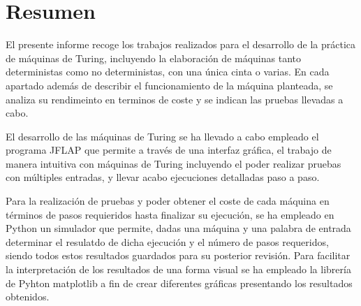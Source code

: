 \part{Resumen}

El presente informe recoge los trabajos realizados para el desarrollo de la práctica de máquinas de Turing, incluyendo la elaboración de máquinas tanto deterministas como no deterministas, con una única cinta o varias. En cada apartado además de describir el funcionamiento de la máquina planteada, se analiza su rendimeinto en terminos de coste y se indican las pruebas llevadas a cabo.\medskip

El desarrollo de las máquinas de Turing se ha llevado a cabo empleado el programa JFLAP \supercite{jflap} que permite a través de una interfaz gráfica, el trabajo de manera intuitiva con máquinas de Turing incluyendo el poder realizar pruebas con múltiples entradas, y llevar acabo ejecuciones detalladas paso a paso.\medskip

Para la realización de pruebas y poder obtener el coste de cada máquina en términos de pasos requieridos hasta finalizar su ejecución, se ha empleado en Python un simulador que permite, dadas una máquina y una palabra de entrada determinar el resulatdo de dicha ejecución y el número de pasos requeridos, siendo todos estos resultados guardados para su posterior revisión. Para facilitar la interpretación de los resultados de una forma visual se ha empleado la librería de Pyhton matplotlib\supercite{matplotlib} a fin de crear diferentes gráficas presentando los resultados obtenidos.
